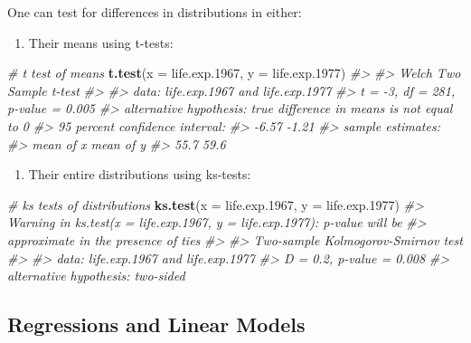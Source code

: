 \documentclass[]{book}
\newenvironment{Shaded}{\begin{snugshade}}{\end{snugshade}}
\newcommand{\KeywordTok}[1]{\textcolor[rgb]{0.13,0.29,0.53}{\textbf{#1}}}
\newcommand{\DataTypeTok}[1]{\textcolor[rgb]{0.13,0.29,0.53}{#1}}
\newcommand{\DecValTok}[1]{\textcolor[rgb]{0.00,0.00,0.81}{#1}}
\newcommand{\CommentTok}[1]{\textcolor[rgb]{0.56,0.35,0.01}{\textit{#1}}}
\newcommand{\NormalTok}[1]{#1}
\providecommand{\tightlist}{%
  \setlength{\itemsep}{0pt}\setlength{\parskip}{0pt}}
\begin{document}
One can test for differences in distributions in either:

\begin{enumerate}
\def\labelenumi{\arabic{enumi})}
\tightlist
\item
  Their means using t-tests:
\end{enumerate}

\begin{Shaded}
\begin{Highlighting}[]
\CommentTok{# t test of means}
\KeywordTok{t.test}\NormalTok{(}\DataTypeTok{x =}\NormalTok{ life.exp.}\DecValTok{1967}\NormalTok{, }\DataTypeTok{y =}\NormalTok{ life.exp.}\DecValTok{1977}\NormalTok{)}
\CommentTok{#> }
\CommentTok{#>  Welch Two Sample t-test}
\CommentTok{#> }
\CommentTok{#> data:  life.exp.1967 and life.exp.1977}
\CommentTok{#> t = -3, df = 281, p-value = 0.005}
\CommentTok{#> alternative hypothesis: true difference in means is not equal to 0}
\CommentTok{#> 95 percent confidence interval:}
\CommentTok{#>  -6.57 -1.21}
\CommentTok{#> sample estimates:}
\CommentTok{#> mean of x mean of y }
\CommentTok{#>      55.7      59.6}
\end{Highlighting}
\end{Shaded}

\begin{enumerate}
\def\labelenumi{\arabic{enumi})}
\setcounter{enumi}{1}
\tightlist
\item
  Their entire distributions using ks-tests:
\end{enumerate}

\begin{Shaded}
\begin{Highlighting}[]
\CommentTok{# ks tests of distributions}
\KeywordTok{ks.test}\NormalTok{(}\DataTypeTok{x =}\NormalTok{ life.exp.}\DecValTok{1967}\NormalTok{, }\DataTypeTok{y =}\NormalTok{ life.exp.}\DecValTok{1977}\NormalTok{)}
\CommentTok{#> Warning in ks.test(x = life.exp.1967, y = life.exp.1977): p-value will be}
\CommentTok{#> approximate in the presence of ties}
\CommentTok{#> }
\CommentTok{#>  Two-sample Kolmogorov-Smirnov test}
\CommentTok{#> }
\CommentTok{#> data:  life.exp.1967 and life.exp.1977}
\CommentTok{#> D = 0.2, p-value = 0.008}
\CommentTok{#> alternative hypothesis: two-sided}
\end{Highlighting}
\end{Shaded}

\subsection{Regressions and Linear
Models}\label{regressions-and-linear-models}
\end{document}
